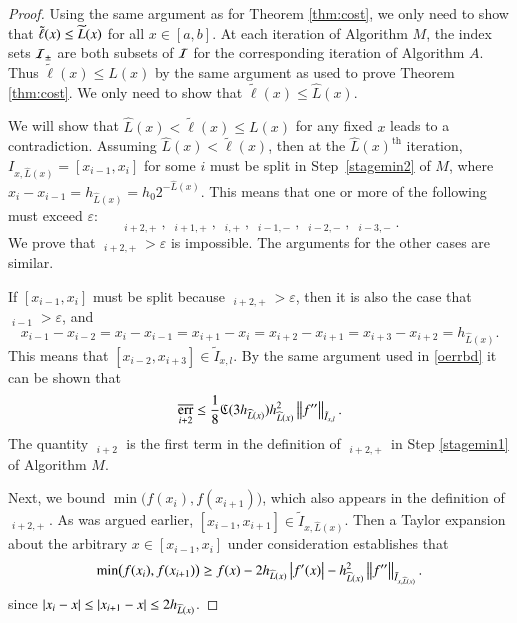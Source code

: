 \documentclass[review]{elsarticle}
\newcommand{\abstol}{\varepsilon}
\theoremstyle{definition}
\newcommand{\tell}{\tilde{\ell}}
\newcommand{\chL}{\widehat{L}}
\DeclareMathOperator{\oerr}{\overline{err}}
\DeclareMathOperator{\herr}{\widehat{err}}
\begin{document}
\begin{proof}
%		
%

Using the same argument as for Theorem \ref{thm:cost}, we only need to show that
$\tell(x) \le \tL(x)$ for all $x \in [a,b]$.  At each iteration of Algorithm $M$, the index sets $\mathcal{I}_{\pm}$ are both subsets of $\mathcal{I}$ for the corresponding iteration of Algorithm $A$.  Thus $\tell(x)
\le L(x)$ by the same argument as used to prove Theorem \ref{thm:cost}.  We
only need to show that $\tell(x) \le \chL(x)$.
	
We will show that $\chL(x) < \tell(x) \le L(x)$ for any fixed $x$  leads to a contradiction.  Assuming $\chL(x) < \tell(x)$, then at the $\chL(x)^{\text{th}}$  iteration,
$I_{x,\chL(x)} = [x_{i-1},x_i]$ for some $i$ must be split in Step~\ref{stagemin2} of $M$, where $x_i-x_{i-1}= h_{\chL(x)} = h_0 2^{-\chL(x)}$.  This means that one or more of the following must exceed $\abstol$:
\[
\herr_{i+2,+} , \ \herr_{i+1,+}, \ \herr_{i,+}, \  \herr_{i-1,-}, \ \herr_{i-2,-}, \ \herr_{i-3,-}.
\]
We prove that $\herr_{i+2,+} > \abstol$ is impossible.  The arguments for the other cases are similar.

If $[x_{i-1},x_i]$ must be split because $\herr_{i+2,+} > \abstol$, then it is also the case that $\oerr_{i-1} > \abstol$, and 
\[
x_{i-1} - x_{i-2} = x_i - x_{i-1} = x_{i+1} - x_i = x_{i+2} - x_{i+1}  = x_{i+3} - x_{i+2} = h_{\chL(x)}.
\]
This means that $[x_{i-2},x_{i+3}] \in \tilde{I}_{x,l}$. By the same argument used in \eqref{oerrbd} it can be shown that
\[
\oerr_{i+2} \le \frac{1}{8} \fC(3 h_{\chL(x)}) h_{\chL(x)}^2 \norm[\tilde{I}_{x,l}]{f''}.
\]
The quantity $\oerr_{i+2}$ is the first term in the definition of $\herr_{i+2,+}$ in Step \ref{stagemin1} of Algorithm $M$.

Next, we bound $\min\bigl(f(x_{i}),f(x_{i+1}) \bigr)$, which also appears in the
definition of $\herr_{i+2,+}$. As was argued earlier, $[x_{i-1},x_{i+1}] \in
\tilde{I}_{x,\chL(x)}$. Then a Taylor expansion about the arbitrary $x \in [x_{i-1},x_{i}] $ under consideration establishes that
\begin{equation} \label{minfjjm1bd}
\min\bigl(f(x_{i}),f(x_{i+1}) \bigr)
\ge f(x) - 2h_{\chL(x)}\abs{f'(x)} - h_{\chL(x)}^2 \norm[\bar{I}_{x,\chL(x)}]{f''} .
\end{equation}
since $\abs{x_i - x} \le \abs{x_{i+1} - x} \le 2h_{\chL(x)}$.



\end{proof}
\end{document}
